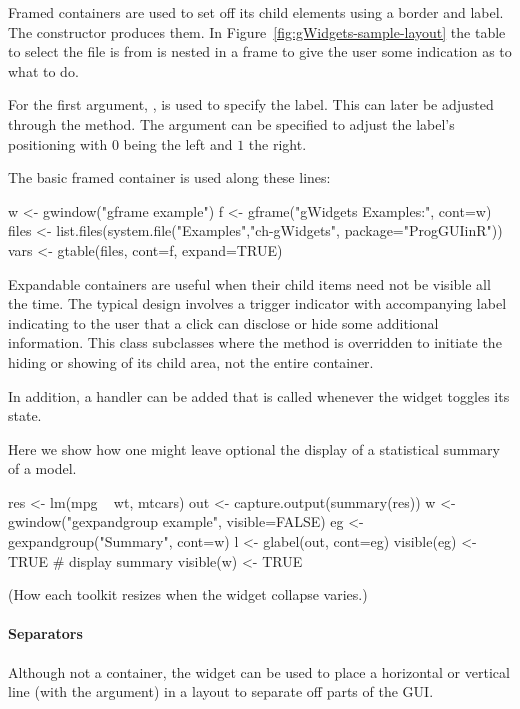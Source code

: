 Framed containers are used to set off its child elements using a
border and label. The  constructor produces
them. In Figure~\ref{fig:gWidgets-sample-layout} the table to select
the file is from is nested in a frame to give the user some indication
as to what to do.

For  the first argument, , is
used to specify the label. This can later be adjusted through the
 method. The argument
 can be specified to adjust the label's
positioning with $0$ being the left and $1$ the right.



The basic framed container is used along these lines:
\begin{Schunk}
\begin{Sinput}
 w <- gwindow("gframe example")
 f <- gframe("gWidgets Examples:", cont=w)
 files <- list.files(system.file("Examples","ch-gWidgets", 
                                 package="ProgGUIinR"))
 vars <- gtable(files, cont=f, expand=TRUE)
\end{Sinput}
\end{Schunk}


Expandable containers are useful when their child items need not be
visible all the time. The typical design involves a trigger indicator
with accompanying label indicating to the user that a click can
disclose or hide some additional information. This class subclasses
 where the  method
is overridden to initiate the hiding or showing of its child area, not
the entire container.

In addition, a handler can be added that is called whenever the widget
toggles its state.

Here we show how one might leave optional the display of a statistical
summary of a model.
\begin{Schunk}
\begin{Sinput}
 res <- lm(mpg ~ wt, mtcars)
 out <- capture.output(summary(res))
 w <- gwindow("gexpandgroup example", visible=FALSE)
 eg <- gexpandgroup("Summary", cont=w)
 l <- glabel(out, cont=eg)
 visible(eg) <- TRUE                     # display summary
 visible(w) <- TRUE
\end{Sinput}
\end{Schunk}

(How each toolkit resizes when the widget collapse varies.)

\paragraph{Separators}
Although not a container, the  widget can be
used to place a horizontal or vertical line (with the
 argument) in a layout to separate off parts of
the GUI. 




